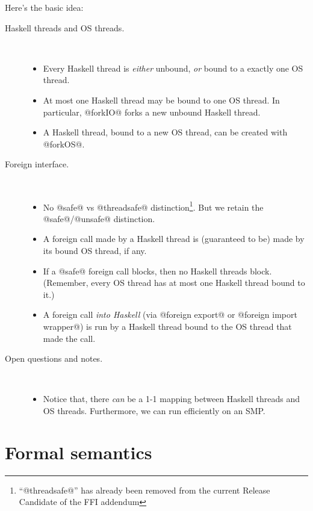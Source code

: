 \documentclass[a4paper,twoside]{article}
\begin{document}
Here's the basic idea:
\begin{description}
\item[Haskell threads and OS threads.] \mbox{}\\
\begin{itemize}
\item Every Haskell thread is \emph{either} unbound, \emph{or} bound to a exactly one OS thread.  

\item At most one Haskell thread may be bound to one OS thread.
In particular, @forkIO@ forks a new unbound Haskell thread.

\item A Haskell thread, bound to a new OS thread, can be created with @forkOS@.

\end{itemize}

\item[Foreign interface.] \mbox{}\\
\begin{itemize}
\item No @safe@ vs @threadsafe@ distinction\footnote{``@threadsafe@'' has already
been removed from the current Release Candidate of the FFI addendum}. But we retain
the @safe@/@unsafe@ distinction.
\item A foreign call made by a Haskell thread is (guaranteed to be) made by its bound OS thread, if
any.

\item If a @safe@ foreign call blocks, then no Haskell threads block.  (Remember, every OS thread
has at most one Haskell thread bound to it.)

\item A foreign call \emph{into Haskell} (via @foreign export@ or @foreign import wrapper@) is 
run by a Haskell thread bound to the OS thread that made the call.
\end{itemize}


\item[Open questions and notes.] \mbox{}\\
\begin{itemize}
\item Notice that, there \emph{can} be a 1-1 mapping between Haskell threads
and OS threads.  Furthermore, we can run efficiently on an SMP.
\end{itemize}
\end{description}


\section{Formal semantics}
\end{document}
